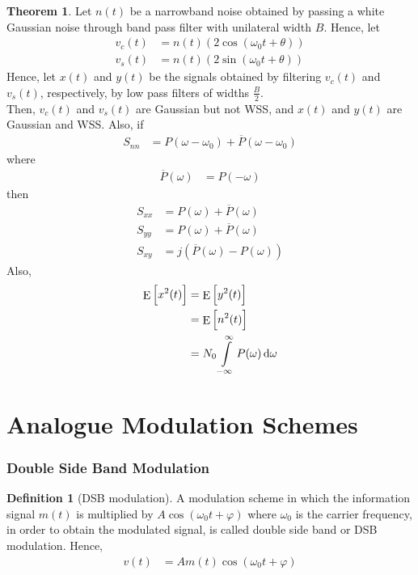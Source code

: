 \documentclass[titlepage, fleqn, a4paper, 12pt, twoside]{article}
\theoremstyle{definition}
\newtheorem{definition}{Definition}
\theoremstyle{theorem}
\newtheorem{theorem}{Theorem}
\DeclareMathOperator{\expct}{\mathrm{E}}
\begin{document}
\begin{theorem}
	Let $n(t)$ be a narrowband noise obtained by passing a white Gaussian noise through band pass filter with unilateral width $B$.
	Hence, let
	\begin{align*}
		v_c(t) &= n(t) \left( 2 \cos(\omega_0 t + \theta) \right)\\
		v_s(t) &= n(t) \left( 2 \sin(\omega_0 t + \theta) \right)
	\end{align*}
	Hence, let $x(t)$ and $y(t)$ be the signals obtained by filtering $v_c(t)$ and $v_s(t)$, respectively, by low pass filters of widths $\frac{B}{2}$.\\
	Then, $v_c(t)$ and $v_s(t)$ are Gaussian but not WSS, and $x(t)$ and $y(t)$ are Gaussian and WSS.
	Also, if
	\begin{align*}
		S_{n n} &= P(\omega - \omega_0) + \overline{P}(\omega - \omega_0)
	\end{align*}
	where
	\begin{align*}
		\overline{P}(\omega) &= P(-\omega)
	\end{align*}
	then
	\begin{align*}
		S_{x x} &= P(\omega) + \overline{P}(\omega)\\
		S_{y y} &= P(\omega) + \overline{P}(\omega)\\
		S_{x y} &= j \left( \overline{P}(\omega) - P(\omega) \right)
	\end{align*}
	Also,
	\begin{align*}
		\expct\left[ x^2(t) \right] &= \expct\left[ y^2(t) \right]\\
		&= \expct\left[ n^2(t) \right]\\
		&= N_0 \int\limits_{-\infty}^{\infty} P(\omega) \dif \omega
	\end{align*}
\end{theorem}

\clearpage
\part{Analogue Modulation Schemes}

\section{Double Side Band Modulation}

\begin{definition}[DSB modulation]
	A modulation scheme in which the information signal $m(t)$ is multiplied by $A \cos(\omega_0 t + \varphi)$ where $\omega_0$ is the carrier frequency, in order to obtain the modulated signal, is called double side band or DSB modulation.
	Hence,
	\begin{align*}
		v(t) &= A m(t) \cos(\omega_0 t + \varphi)
	\end{align*}
\end{definition}
\end{document}
